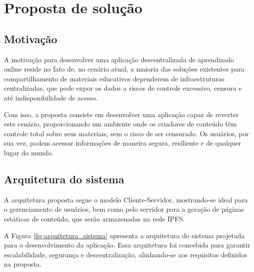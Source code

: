 \chapter[Proposta de solução]{Proposta de solução}

\section[Motivação]{Motivação}
A motivação para desenvolver uma aplicação descentralizada  de aprendizado online reside no fato de, no cenário atual, a maioria das soluções existentes para compartilhamento de materiais educativos dependerem de infraestruturas centralizadas, que pode expor os dados a riscos de controle excessivo, censura e até indisponibilidade de acesso.

Com isso, a proposta consiste em desenvolver uma aplicação capaz de reverter este cenário, proporcionando um ambiente onde os criadores de conteúdo têm controle total sobre seus materiais, sem o risco de ser censurado. Os usuários, por sua vez, podem acessar informações de maneira segura, resiliente e de qualquer lugar do mundo.

\section[Arquitetura do sistema]{Arquitetura do sistema}

A arquitetura proposta segue o modelo Cliente-Servidor, mostrando-se ideal para o gerenciamento de usuários, bem como pelo servidor para a geração de páginas estáticas de conteúdo, que serão armazenadas na rede IPFS.

A Figura \ref{fig:arquitetura_sistema} apresenta a arquitetura do sistema projetada para o desenvolvimento da aplicação. Essa arquitetura foi concebida para garantir escalabilidade, segurança e descentralização, alinhando-se aos requisitos definidos na proposta.



